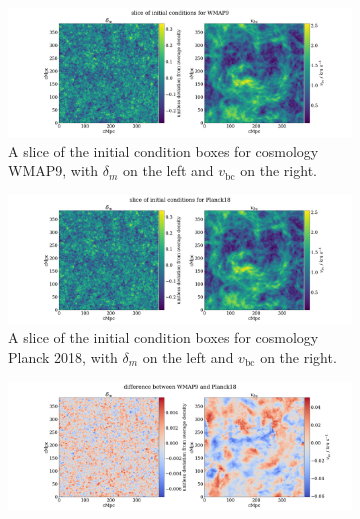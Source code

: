 \documentclass[floats,floatfix,showpacs,amssymb,prd,superscriptaddress,nofootinbib]{revtex4-2} %
\begin{document}
\begin{figure}
     \centering
     \begin{subfigure}[b]{0.9\textwidth}
         \centering
         \includegraphics[width=\textwidth]{images/ic_grids/initial_condition_grid_WMAP9.png}
         \caption{A slice of the initial condition boxes for cosmology WMAP9, with $\delta_m$ on the left and $v_{\text{bc}}$ on the right.}
         \label{fig:IC_WMAP9}
     \end{subfigure}
     \hfill
     \begin{subfigure}[b]{0.9\textwidth}
         \centering
         \includegraphics[width=\textwidth]{images/ic_grids/initial_condition_grid_Planck18.png}
         \caption{A slice of the initial condition boxes for cosmology Planck 2018, with $\delta_m$ on the left and $v_{\text{bc}}$ on the right.}
         \label{fig:IC_Planck18}
     \end{subfigure}
     \hfill
     \begin{subfigure}[b]{0.9\textwidth}
         \centering
         \includegraphics[width=\textwidth]{images/ic_grids/difference_in_initial_grid_WMAP9_Planck18.png}

\end{subfigure}
\end{figure}
\end{document}
